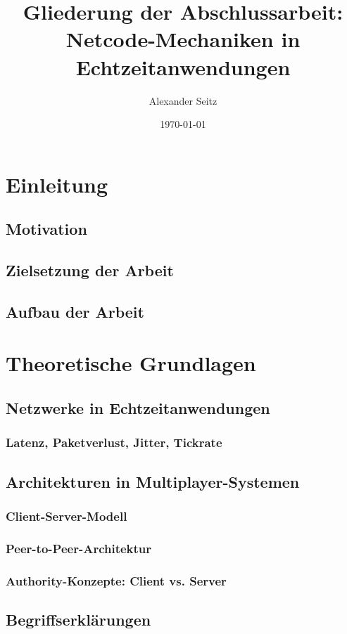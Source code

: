 \documentclass[12pt,a4paper]{article}
\title{Gliederung der Abschlussarbeit:\\
Netcode-Mechaniken in Echtzeitanwendungen}
\author{Alexander Seitz}
\date{\today}
\begin{document}
\maketitle
\tableofcontents
\newpage

\section{Einleitung}
\subsection{Motivation}
\subsection{Zielsetzung der Arbeit}
\subsection{Aufbau der Arbeit}

\clearpage

\section{Theoretische Grundlagen}
\subsection{Netzwerke in Echtzeitanwendungen}
\subsubsection{Latenz, Paketverlust, Jitter, Tickrate}
\subsection{Architekturen in Multiplayer-Systemen}
\subsubsection{Client-Server-Modell}
\subsubsection{Peer-to-Peer-Architektur}
\subsubsection{Authority-Konzepte: Client vs. Server}
\subsection{Begriffserklärungen}
\end{document}

